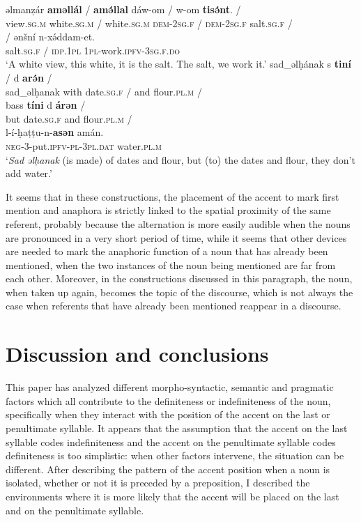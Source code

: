 \documentclass[output=paper]{langsci/langscibook}
\begin{document}
\begin{exe}
\ex\label{5ex:46}
\gll	əlmanẓár	{\textbf{aməllál}}	/	{\textbf{amə́llal}}	dáw-om	/	w-om	{\textbf{tisə́nt}}.	/ \\
	view.{\textsc{sg.m}}		white.{\textsc{sg.m}}	/	white.{\textsc{sg.m}}	{\textsc{dem-2sg.f}}	/  {\textsc{dem-2sg.f}}	salt.{\textsc{sg.f}}	/\\
\glt
\exi{}
	/	ənšní	n-xə́ddam-et. \\
	salt.{\textsc{sg.f}}	/	{\textsc{idp.1pl}}	{\textsc{1pl}}-work.{\textsc{ipfv-3sg.f.do}} \\
\glt	`A white view, this white, it is the salt. The salt, we work it.'
\ex\label{5ex:47}
\gll	sad\_əlḥának	s	{\textbf{tiní}}	/	d	{\textbf{arə́n}}	/ \\
	sad\_əlḥanak	with	date.{\textsc{sg.f}}	/	and	flour.{\textsc{pl.m}}	/ \\
\glt
\exi{}
\gll	bass	{\textbf{tíni}}	d	{\textbf{árən}}	/ \\
	but	date.{\textsc{sg.f}}	and	flour.{\textsc{pl.m}}	/ \\
\glt
\exi{}
\gll	l-í-ḥaṭṭu-n-{\textbf{asən}}	amán.\\
	{\textsc{neg}}-3-put.{\textsc{ipfv-pl-3pl.dat}}	water.{\textsc{pl.m}} \\
\glt	`{\emph{Sad əlḥanak}} (is made) of dates and flour, but (to) the dates and flour, they don't add water.'
\end{exe}

It seems that in these constructions, the placement of the accent to mark first mention and anaphora is strictly linked to the spatial proximity of the same referent, probably because the alternation is more easily audible when the nouns are pronounced in a very short period of time, while it seems that other devices are needed to mark the anaphoric function of a noun that has already been mentioned, when the two instances of the noun being mentioned are far from each other. Moreover, in the constructions discussed in this paragraph, the noun, when taken up again, becomes the topic of the discourse, which is not always the case when referents that have already been mentioned reappear in a discourse.

\section{Discussion and conclusions}\label{5sec:5}

This paper has analyzed different morpho-syntactic, semantic and pragmatic factors which all contribute to the definiteness or indefiniteness of the noun, specifically when they interact with the position of the accent on the last or penultimate syllable. It appears that the assumption that the accent on the last syllable codes indefiniteness and the accent on the penultimate syllable codes definiteness is too simplistic: when other factors intervene, the situation can be different. After describing the pattern of the accent position when a noun is isolated, whether or not it is preceded by a preposition, I described the environments where it is more likely that the accent will be placed on the last and on the penultimate syllable.
\end{document}
